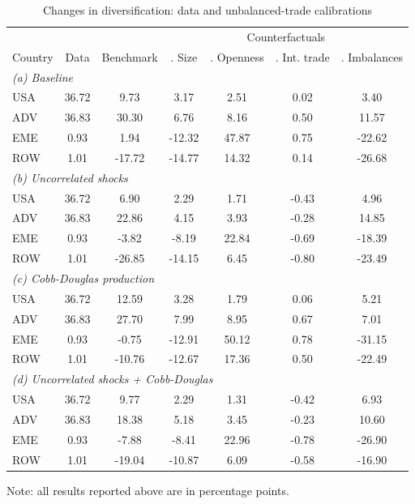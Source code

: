 \begin{table}[p]
\renewcommand{\arraystretch}{1.2}
\begin{center}
\begin{threeparttable}
\caption{Changes in diversification: data and unbalanced-trade calibrations}
\label{tab:results-div-sens}
\begin{tabular}{l c c c c c c}
\toprule
& & & \multicolumn{4}{c}{Counterfactuals}\\
\cmidrule(rl){4-7}
Country & \multicolumn{1}{p{2.1cm}}{\centering Data} & \multicolumn{1}{p{2.1cm}}{\centering Benchmark} & \multicolumn{1}{p{2.1cm}}{\centering 1. Size} & \multicolumn{1}{p{2.1cm}}{\centering 2. Openness} & \multicolumn{1}{p{2.1cm}}{\centering 3. Int. trade} &\multicolumn{1}{p{2.1cm}}{\centering 4. Imbalances}\\
\midrule
\multicolumn{6}{l}{\textit{(a) Baseline}}\\
USA& 36.72&9.73&3.17&2.51&0.02&3.40\\
ADV& 36.83&30.30&6.76&8.16&0.50&11.57\\
EME& 0.93&1.94&-12.32&47.87&0.75&-22.62\\
ROW& 1.01&-17.72&-14.77&14.32&0.14&-26.68\\
\midrule
\multicolumn{6}{l}{\textit{(b) Uncorrelated shocks}}\\
USA& 36.72&6.90&2.29&1.71&-0.43&4.96\\
ADV& 36.83&22.86&4.15&3.93&-0.28&14.85\\
EME& 0.93&-3.82&-8.19&22.84&-0.69&-18.39\\
ROW& 1.01&-26.85&-14.15&6.45&-0.80&-23.49\\
\midrule
\multicolumn{6}{l}{\textit{(c) Cobb-Douglas production}}\\
USA& 36.72&12.59&3.28&1.79&0.06&5.21\\
ADV& 36.83&27.70&7.99&8.95&0.67&7.01\\
EME& 0.93&-0.75&-12.91&50.12&0.78&-31.15\\
ROW& 1.01&-10.76&-12.67&17.36&0.50&-22.49\\
\midrule
\multicolumn{6}{l}{\textit{(d) Uncorrelated shocks + Cobb-Douglas}}\\
USA& 36.72&9.77&2.29&1.31&-0.42&6.93\\
ADV& 36.83&18.38&5.18&3.45&-0.23&10.60\\
EME& 0.93&-7.88&-8.41&22.96&-0.78&-26.90\\
ROW& 1.01&-19.04&-10.87&6.09&-0.58&-16.90\\
\bottomrule
\end{tabular}
\normalsize
\begin{tablenotes}
\small
\item Note: all results reported above are in percentage points.
\normalsize
\end{tablenotes}
\end{threeparttable}
\end{center}
\end{table}
